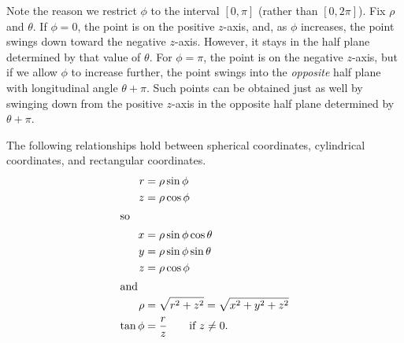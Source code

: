 \begin{center}
\end{center}

Note the reason we restrict $\phi$ to the interval $[0,\pi]$ (rather than
$[0,2\pi]$). Fix $\rho$
and $\theta$.   If $\phi = 0$,
the point is on the positive $z$-axis, and, as $\phi$ increases,
the point swings down toward the negative $z$-axis. However, it stays
in the half plane determined by that value of $\theta$.  For
$\phi = \pi$, the point is on the negative $z$-axis, but if we
allow $\phi$ to increase further, the point swings into the
\emph{opposite} half plane with longitudinal angle $\theta + \pi$.
Such points can be obtained just as well by swinging down from
the positive $z$-axis in the opposite half plane determined by
$\theta + \pi$.

The following relationships hold between spherical coordinates,
cylindrical coordinates, and rectangular coordinates. 
\begin{align*}
	r & = \rho \sin\phi \\
	z & = \rho \cos\phi \\
	\intertext{so}
	x &=  \rho \sin\phi \cos\theta \\
	y &=  \rho \sin\phi \sin\theta \\
	z & = \rho \cos\phi\\
	\intertext{and}
	\rho &= \sqrt{r^2 + z^2} = \sqrt{x^2 + y^2 + z^2} \\
	\tan\phi &= \frac rz\qquad\text{if } z \ne 0.
\end{align*}


